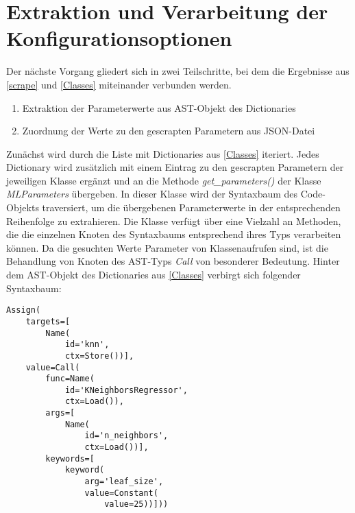 \documentclass[german,bachelor]{swsLeipzig}
\begin{document}
\section{Extraktion und Verarbeitung der Konfigurationsoptionen} \label{Parameters}
Der nächste Vorgang gliedert sich in zwei Teilschritte, bei dem die Ergebnisse aus \ref{scrape} und \ref{Classes} miteinander
verbunden werden.

\begin{enumerate}
 \item Extraktion der Parameterwerte aus AST-Objekt des Dictionaries
 \item Zuordnung der Werte zu den gescrapten Parametern aus JSON-Datei
\end{enumerate}

\noindent Zunächst wird durch die Liste mit Dictionaries aus \ref{Classes} iteriert.
Jedes Dictionary wird zusätzlich mit einem Eintrag zu den gescrapten Parametern der jeweiligen Klasse ergänzt und an die Methode \textit{get\_parameters()}
der Klasse \textit{MLParameters} übergeben.
In dieser Klasse wird der Syntaxbaum des Code-Objekts traversiert, um die übergebenen Parameterwerte in der
entsprechenden Reihenfolge zu extrahieren.
Die Klasse verfügt über eine Vielzahl an Methoden, die die einzelnen Knoten des Syntaxbaums entsprechend ihres Typs
verarbeiten können.
Da die gesuchten Werte Parameter von Klassenaufrufen sind, ist die Behandlung von Knoten des AST-Typs \textit{Call} von
besonderer Bedeutung.
Hinter dem AST-Objekt des Dictionaries aus \ref{Classes} verbirgt sich folgender Syntaxbaum: \\

\noindent\begin{minipage}{\linewidth}
\begin{lstlisting}[frame=single, label=class_dict, basicstyle=\small, caption={AST der KNeighborsRegressor-Klasse},captionpos=b]
Assign(
    targets=[
        Name(
            id='knn',
            ctx=Store())],
    value=Call(
        func=Name(
            id='KNeighborsRegressor',
            ctx=Load()),
        args=[
            Name(
                id='n_neighbors',
                ctx=Load())],
        keywords=[
            keyword(
                arg='leaf_size',
                value=Constant(
                    value=25))]))
\end{lstlisting}
\end{minipage}
\
\end{document}
